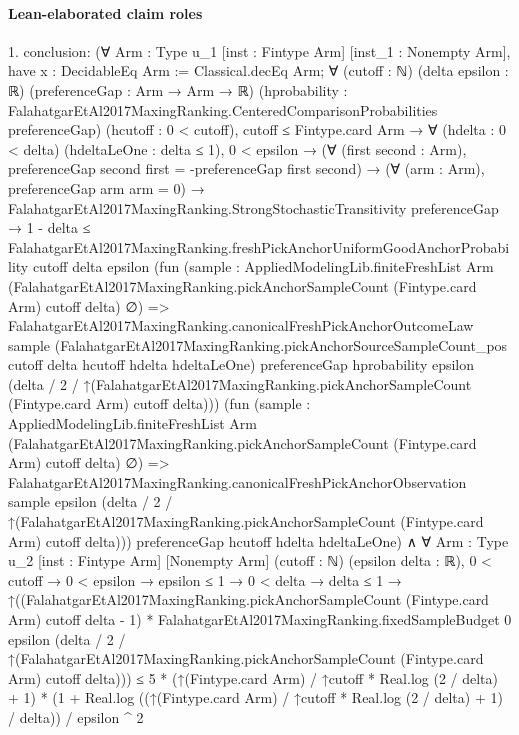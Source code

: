 \documentclass[10pt]{article}
\begin{document}
\paragraph{Lean-elaborated claim roles}\begin{ReviewVerbatim}
1. conclusion: (∀ {Arm : Type u_1} [inst : Fintype Arm] [inst_1 : Nonempty Arm],
    have x : DecidableEq Arm := Classical.decEq Arm;
    ∀ (cutoff : ℕ) (delta epsilon : ℝ) (preferenceGap : Arm → Arm → ℝ)
      (hprobability : FalahatgarEtAl2017MaxingRanking.CenteredComparisonProbabilities preferenceGap)
      (hcutoff : 0 < cutoff),
      cutoff ≤ Fintype.card Arm →
        ∀ (hdelta : 0 < delta) (hdeltaLeOne : delta ≤ 1),
          0 < epsilon →
            (∀ (first second : Arm), preferenceGap second first = -preferenceGap first second) →
              (∀ (arm : Arm), preferenceGap arm arm = 0) →
                FalahatgarEtAl2017MaxingRanking.StrongStochasticTransitivity preferenceGap →
                  1 - delta ≤
                    FalahatgarEtAl2017MaxingRanking.freshPickAnchorUniformGoodAnchorProbability cutoff delta epsilon
                      (fun
                          (sample :
                            AppliedModelingLib.finiteFreshList Arm
                              (FalahatgarEtAl2017MaxingRanking.pickAnchorSampleCount (Fintype.card Arm) cutoff delta)
                              ∅) =>
                        FalahatgarEtAl2017MaxingRanking.canonicalFreshPickAnchorOutcomeLaw sample
                          (FalahatgarEtAl2017MaxingRanking.pickAnchorSourceSampleCount_pos cutoff delta hcutoff hdelta
                            hdeltaLeOne)
                          preferenceGap hprobability epsilon
                          (delta / 2 /
                            ↑(FalahatgarEtAl2017MaxingRanking.pickAnchorSampleCount (Fintype.card Arm) cutoff delta)))
                      (fun
                          (sample :
                            AppliedModelingLib.finiteFreshList Arm
                              (FalahatgarEtAl2017MaxingRanking.pickAnchorSampleCount (Fintype.card Arm) cutoff delta)
                              ∅) =>
                        FalahatgarEtAl2017MaxingRanking.canonicalFreshPickAnchorObservation sample epsilon
                          (delta / 2 /
                            ↑(FalahatgarEtAl2017MaxingRanking.pickAnchorSampleCount (Fintype.card Arm) cutoff delta)))
                      preferenceGap hcutoff hdelta hdeltaLeOne) ∧
  ∀ {Arm : Type u_2} [inst : Fintype Arm] [Nonempty Arm] (cutoff : ℕ) (epsilon delta : ℝ),
    0 < cutoff →
      0 < epsilon →
        epsilon ≤ 1 →
          0 < delta →
            delta ≤ 1 →
              ↑((FalahatgarEtAl2017MaxingRanking.pickAnchorSampleCount (Fintype.card Arm) cutoff delta - 1) *
                    FalahatgarEtAl2017MaxingRanking.fixedSampleBudget 0 epsilon
                      (delta / 2 /
                        ↑(FalahatgarEtAl2017MaxingRanking.pickAnchorSampleCount (Fintype.card Arm) cutoff delta))) ≤
                5 * (↑(Fintype.card Arm) / ↑cutoff * Real.log (2 / delta) + 1) *
                    (1 + Real.log ((↑(Fintype.card Arm) / ↑cutoff * Real.log (2 / delta) + 1) / delta)) /
                  epsilon ^ 2
\end{ReviewVerbatim}
\end{document}
